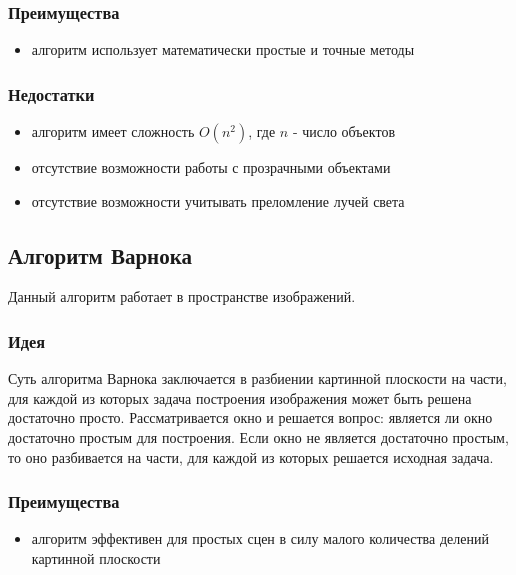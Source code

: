       \subsubsection{Преимущества}
      
      \begin{itemize}
        \item алгоритм использует математически простые и точные методы
      \end{itemize}
      
      \subsubsection{Недостатки}
      
      \begin{itemize}
        \item алгоритм имеет сложность $O(n^2)$, где $n$ - число объектов
        \item отсутствие возможности работы с прозрачными объектами
        \item отсутствие возможности учитывать преломление лучей света
      \end{itemize}
  
    \subsection{Алгоритм Варнока}
    
      Данный алгоритм работает в пространстве изображений.
    
      \subsubsection{Идея}
      
        Суть алгоритма Варнока заключается в разбиении картинной плоскости на части, для каждой из которых задача построения изображения может быть решена достаточно просто. Рассматривается окно и решается вопрос: является ли окно достаточно простым для построения. Если окно не является достаточно простым, то оно разбивается на части, для каждой из которых решается исходная задача.
      
      \subsubsection{Преимущества}
      
      \begin{itemize}
        \item алгоритм эффективен для простых сцен в силу малого количества делений картинной плоскости
      \end{itemize}
      
